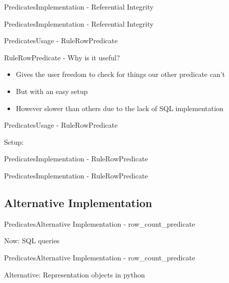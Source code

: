 \begin{frame}{Predicates}{Implementation - Referential Integrity}
\end{frame}

\begin{frame}{Predicates}{Implementation - Referential Integrity}
\end{frame}

\begin{frame}{Predicates}{Usage - RuleRowPredicate}
	\begin{block}{RuleRowPredicate - Why is it useful?}
		\begin{itemize}
			\item<1-> Gives the user freedom to check for things our other predicate can't
			\item<1-> But with an easy setup
			\item<2-> However slower than others due to the lack of SQL implementation
		\end{itemize}
	\end{block}
\end{frame}

\begin{frame}{Predicates}{Usage - RuleRowPredicate}
  \begin{block}{Setup:}
	\end{block}
\end{frame}

\begin{frame}{Predicates}{Implementation - RuleRowPredicate}
\end{frame}

\begin{frame}{Predicates}{Implementation - RuleRowPredicate}
\end{frame}

\subsection{Alternative Implementation}
\begin{frame}{Predicates}{Alternative Implementation - row\_count\_predicate}
	\begin{block}{Now: SQL queries}
	\end{block}
\end{frame}

\begin{frame}{Predicates}{Alternative Implementation - row\_count\_predicate}
	\begin{block}{Alternative: Representation objects in python}
	\end{block}
\end{frame}

	
